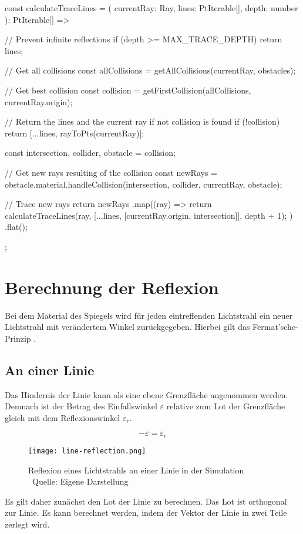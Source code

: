 \begin{verbnobox}[\scriptsize\mbox{}]
const calculateTraceLines = (
    currentRay: Ray,
    lines: PtIterable[],
    depth: number
): PtIterable[] => {
    // Prevent infinite reflections
    if (depth >= MAX_TRACE_DEPTH) return lines;

    // Get all collisions
    const allCollisions = getAllCollisions(currentRay, obstacles);

    // Get best collision
    const collision = getFirstCollision(allCollisions, currentRay.origin);

    // Return the lines and the current ray if not collision is found
    if (!collision) return [...lines, rayToPts(currentRay)];

    const { intersection, collider, obstacle } = collision;

    // Get new rays resulting of the collision
    const newRays = obstacle.material.handleCollision(intersection, collider, currentRay, obstacle);

    // Trace new rays
    return newRays
        .map((ray) => {
            return calculateTraceLines(ray, [...lines, [currentRay.origin, intersection]], depth + 1);
        })
        .flat();
    };
\end{verbnobox}

\section{Berechnung der Reflexion}
Bei dem Material des Spiegels wird für jeden eintreffenden Lichtstrahl ein neuer Lichtstrahl mit verändertem Winkel zurückgegeben. 
Hierbei gilt das Fermat’sche-Prinzip \parencite[vgl.][S. 20]{hering2017optik}.


\subsection*{An einer Linie}
Das Hindernis der Linie kann als eine ebene Grenzfläche angenommen werden. 
Demnach ist der Betrag des Einfallswinkel $ \varepsilon $ relative zum Lot der Grenzfläche gleich mit dem Reflexionswinkel $ \varepsilon_r $. 

\begin{equation}
    -\varepsilon = \varepsilon_r
\end{equation}
\begin{figure}
    \centering
    \texttt{[image: line-reflection.png]}

    \caption{Reflexion eines Lichtstrahls an einer Linie in der Simulation  \\ Quelle: Eigene Darstellung}

\end{figure}
Es gilt daher zunächst den Lot der Linie zu berechnen. Das Lot ist orthogonal zur Linie. 
Es kann berechnet werden, indem der Vektor der Linie in zwei Teile zerlegt wird. \parencite[vgl.][S. 1]{greve2006raytracing}

